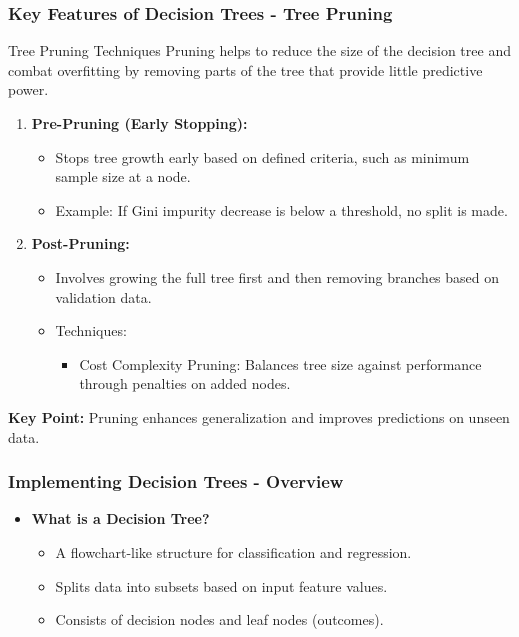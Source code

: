 \documentclass{beamer}
\begin{document}
\begin{frame}[fragile]
    \frametitle{Key Features of Decision Trees - Tree Pruning}
    \begin{block}{Tree Pruning Techniques}
        Pruning helps to reduce the size of the decision tree and combat overfitting by removing parts of the tree that provide little predictive power.
        \begin{enumerate}
            \item \textbf{Pre-Pruning (Early Stopping):}
                \begin{itemize}
                    \item Stops tree growth early based on defined criteria, such as minimum sample size at a node.
                    \item Example: If Gini impurity decrease is below a threshold, no split is made.
                \end{itemize}
            \item \textbf{Post-Pruning:}
                \begin{itemize}
                    \item Involves growing the full tree first and then removing branches based on validation data.
                    \item Techniques:
                    \begin{itemize}
                        \item Cost Complexity Pruning: Balances tree size against performance through penalties on added nodes.
                    \end{itemize}
                \end{itemize}
        \end{enumerate}
        \textbf{Key Point:} Pruning enhances generalization and improves predictions on unseen data.
    \end{block}
\end{frame}

\begin{frame}[fragile]
    \frametitle{Implementing Decision Trees - Overview}
    \begin{itemize}
        \item \textbf{What is a Decision Tree?}
        \begin{itemize}
            \item A flowchart-like structure for classification and regression.
            \item Splits data into subsets based on input feature values.
            \item Consists of decision nodes and leaf nodes (outcomes).
        \end{itemize}
    \end{itemize}
\end{frame}
\end{document}
